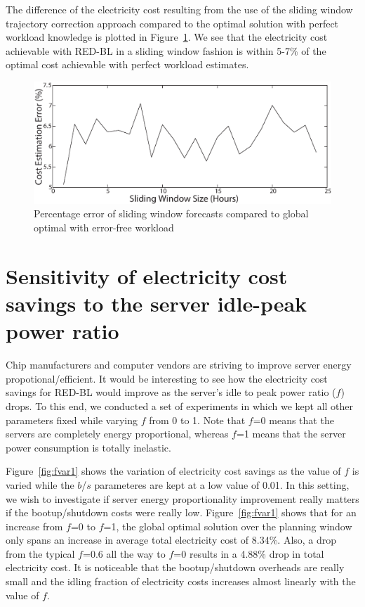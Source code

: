 The difference of the electricity cost resulting from the use of the sliding window trajectory correction approach compared to the optimal solution with perfect workload knowledge is plotted in Figure~\ref{fig:s5r}. We see that the electricity cost achievable with RED-BL in a sliding window fashion is within 5-7$\%$ of the optimal cost achievable with perfect workload estimates. 

\begin{figure}[htbp]
    \centering
    \includegraphics[width=1\textwidth]{pics/sw-cost-error-2.eps}
\caption{Percentage error of sliding window forecasts compared to global optimal with error-free workload}
\label{fig:s5r}
\end{figure}



\section{Sensitivity of electricity cost savings to the server idle-peak power ratio}
Chip manufacturers and computer vendors are striving to improve server energy propotional/efficient. It would be interesting to see how the electricity cost savings for RED-BL would improve as the server's idle to peak power ratio ($f$) drops. To this end, we conducted a set of experiments in which we kept all other parameters fixed while varying $f$ from 0 to 1.  Note that $f$=0 means that the servers are completely energy proportional, whereas $f$=1 means that the server power consumption is totally inelastic.

Figure~\ref{fig:fvar1} shows the variation of electricity cost savings as the value of $f$ is varied while the $b$/$s$ parameteres are kept at a low value of 0.01. In this setting, we wish to investigate if server energy proportionality improvement really matters if the bootup/shutdown costs were really low. Figure~\ref{fig:fvar1} shows that for an increase from $f$=0 to $f$=1, the global optimal solution over the planning window only spans an increase in average total electricity cost of 8.34\%. Also, a drop from the typical $f$=0.6 all the way to $f$=0 results in a 4.88\% drop in total electricity cost. It is noticeable that the bootup/shutdown overheads are really small and the idling fraction of electricity costs increases almost linearly with the value of $f$.
 
